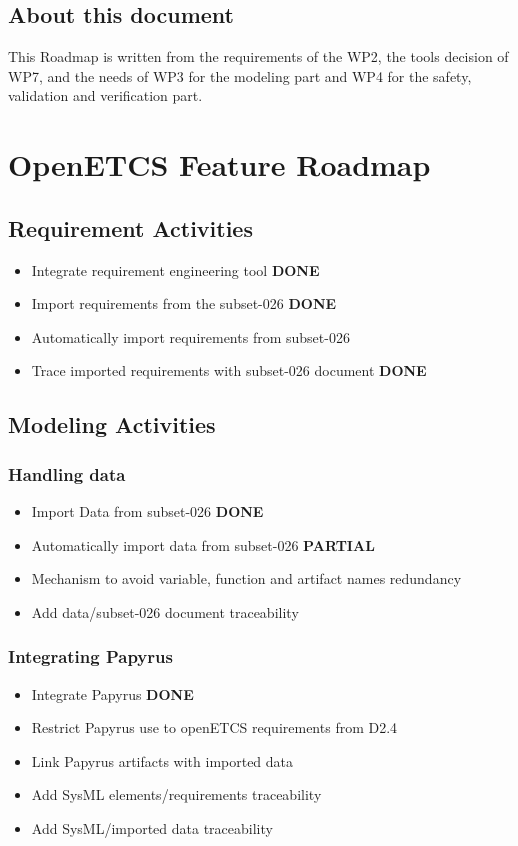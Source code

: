 \documentclass{openetcs_report}
\begin{document}
\section{About this document}
\label{sec-1-2}

This Roadmap is written from the requirements of the WP2, the tools
decision of WP7, and the needs of WP3 for the modeling part and WP4 for
the safety, validation and verification part.




\chapter{OpenETCS Feature Roadmap}
\label{chap-2}

\section{Requirement Activities}
\begin{itemize}
\item Integrate requirement engineering tool {\bf DONE}
\item Import requirements from the subset-026 {\bf DONE}
\item Automatically import requirements from subset-026
\item Trace imported requirements with subset-026 document {\bf DONE}
\end{itemize}

\section{Modeling Activities}
\label{sec-2-Model}

\subsection{Handling data}
\begin{itemize}
\item Import Data from subset-026 {\bf DONE}
\item Automatically import data from subset-026 {\bf PARTIAL}
\item Mechanism to avoid variable, function and artifact names
  redundancy
\item Add data/subset-026 document traceability
\end{itemize}

\subsection{Integrating Papyrus}
\begin{itemize}
\item Integrate Papyrus {\bf DONE}
\item Restrict Papyrus use to openETCS requirements from D2.4
\item Link Papyrus artifacts with imported data
\item Add SysML elements/requirements traceability
\item Add SysML/imported data traceability
\end{itemize}
\end{document}
